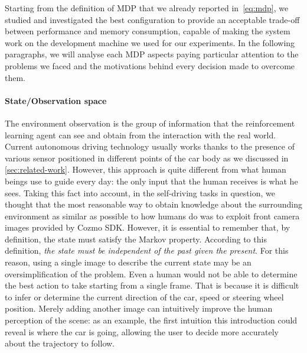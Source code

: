 Starting from the definition of MDP that we already reported in~\vref{eq:mdp}, we studied and investigated the best configuration to provide an acceptable trade-off between performance and memory consumption, capable of making the system work on the development machine we used for our experiments.
In the following paragraphs, we will analyse each MDP aspects paying particular attention to the problems we faced and the motivations behind every decision made to overcome them.

\paragraph{State/Observation space}
The environment observation is the group of information that the reinforcement learning agent can see and obtain from the interaction with the real world.
Current autonomous driving technology usually works thanks to the presence of various sensor positioned in different points of the car body as we discussed in \vref{sec:related-work}.
However, this approach is quite different from what human beings use to guide every day: the only input that the human receives is what he sees.
Taking this fact into account, in the self-driving tasks in question, we thought that the most reasonable way to obtain knowledge about the surrounding environment as similar as possible to how humans do was to exploit front camera images provided by Cozmo SDK.
However, it is essential to remember that, by definition, the state must satisfy the Markov property.
According to this definition, \textit{the state must be independent of the past given the present}.
For this reason, using a single image to describe the current state may be an oversimplification of the problem.
Even a human would not be able to determine the best action to take starting from a single frame.
That is because it is difficult to infer or determine the current direction of the car, speed or steering wheel position.
Merely adding another image can intuitively improve the human perception of the scene: as an example, the first intuition this introduction could reveal is where the car is going, allowing the user to decide more accurately about the trajectory to follow.

